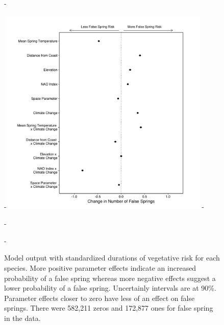 \documentclass{article}\usepackage[]{graphicx}\usepackage[]{color}
\begin{document}
  
{\begin{figure} [H]
  -\begin{center}
  -\includegraphics[width=10cm]{..//analyses/figures/model_output_90.pdf}
  -\caption{Model output with standardized durations of vegetative risk for each species. More positive parameter effects indicate an increased probability of a false spring whereas more negative effects suggest a lower probability of a false spring. Uncertainly intervals are at 90\%. Parameter effects closer to zero have less of an effect on false springs. There were 582,211 zeros and 172,877 ones for false spring in the data.}\label{fig:maineffects}
  -\end{center}
  -\end{figure}}


  
\end{document}
